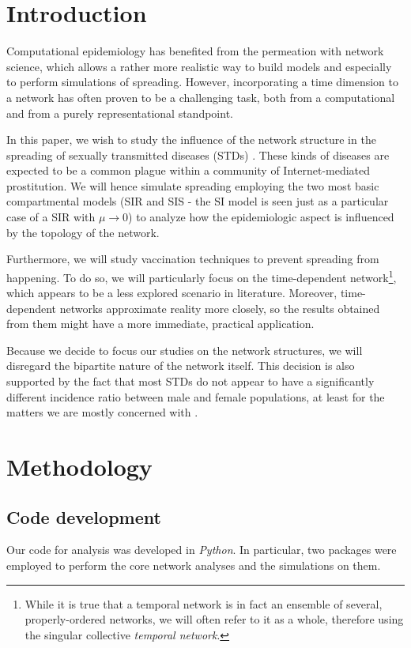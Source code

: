 \documentclass[a4paper,11pt, twocolumn]{article}
\begin{document}
\section{Introduction}
Computational epidemiology has benefited from the permeation with network science, which allows a rather more realistic way to build models and especially to perform simulations of spreading. However, incorporating a time dimension to a network has often proven to be a challenging task, both from a computational and from a purely representational standpoint.

In this paper, we wish to study the influence of the network structure in the spreading of sexually transmitted diseases (STDs) \cite{stds}. These kinds of diseases are expected to be a common plague within a community of Internet-mediated prostitution. We will hence simulate spreading employing the two most basic compartmental models (SIR and SIS - the SI model is seen just as a particular case of a SIR with $\mu \rightarrow 0$) to analyze how the epidemiologic aspect is influenced by the topology of the network.

Furthermore, we will study vaccination techniques to prevent spreading from happening. To do so, we will particularly focus on the time-dependent network\footnote{While it is true that a temporal network is in fact an ensemble of several, properly-ordered networks, we will often refer to it as a whole, therefore using the singular collective \emph{temporal network}.}, which appears to be a less explored scenario in literature. Moreover, time-dependent networks approximate reality more closely, so the results obtained from them might have a more immediate, practical application.

Because we decide to focus our studies on the network structures, we will disregard the bipartite nature of the network itself. This decision is also supported by the fact that most STDs do not appear to have a significantly different incidence ratio between male and female populations, at least for the matters we are mostly concerned with \cite{stds_inc}.  


\section{Methodology}
\subsection{Code development}
Our code for analysis was developed in \emph{Python}. In particular, two packages were employed to perform the core network analyses and the simulations on them.
\end{document}
